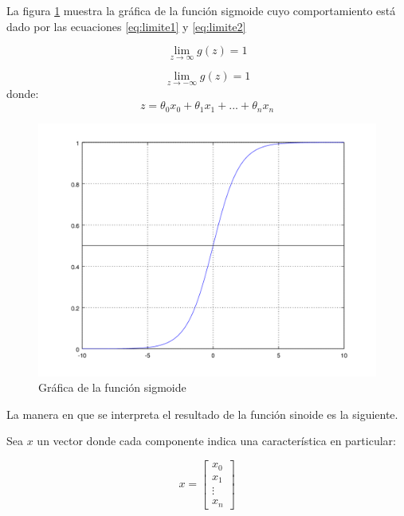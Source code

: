 La figura \ref{fig:sigmoide} muestra la gr\'afica de la funci\'on sigmoide cuyo comportamiento est\'a dado por las ecuaciones \ref{eq:limite1} y \ref{eq:limite2}

\begin{equation}\label{eq:limite1}
\lim_{z \to \infty} g(z) = 1
\end{equation}

\begin{equation}\label{eq:limite2}
\lim_{z \to -\infty} g(z) = 1
\end{equation}
donde:
\begin{equation}
z = \theta_{0}x_{0}+ \theta_{1}x_{1} + ... +  \theta_{n}x_{n}
\end{equation}

\begin{figure}[h]
	\begin{center}
		\includegraphics[scale=.5]{images/sigmoide}
		\caption{Gr\'afica de la funci\'on sigmoide}
		\label{fig:sigmoide}
	\end{center}
\end{figure}

La manera en que se interpreta el resultado de la funci\'on sinoide es la siguiente.

Sea $x$ un vector donde cada componente indica una caracter\'istica en particular:

\begin{equation}
x  = 
\begin{bmatrix}
x_{0} \\
x_{1} \\
\vdots \\
x_{n}
\end{bmatrix}
\end{equation}

